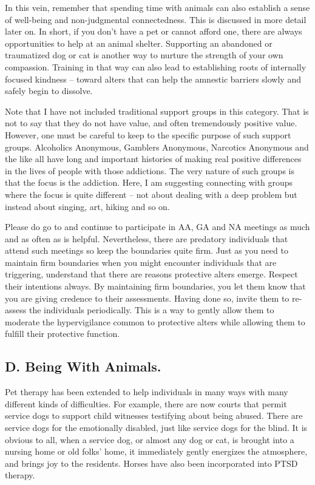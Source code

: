\documentclass[]{book}
\begin{document}
In this vein, remember that spending time with animals can also establish a sense of well-being and non-judgmental connectedness. This is discussed in more detail later on. In short, if you don't have a pet or cannot afford one, there are always opportunities to help at an animal shelter. Supporting an abandoned or traumatized dog or cat is another way to nurture the strength of your own compassion. Training in that way can also lead to establishing roots of internally focused kindness -- toward alters that can help the amnestic barriers slowly and safely begin to dissolve.

Note that I have not included traditional support groups in this category. That is not to say that they do not have value, and often tremendously positive value. However, one must be careful to keep to the specific purpose of such support groups. Alcoholics Anonymous, Gamblers Anonymous, Narcotics Anonymous and the like all have long and important histories of making real positive differences in the lives of people with those addictions. The very nature of such groups is that the focus is the addiction. Here, I am suggesting connecting with groups where the focus is quite different -- not about dealing with a deep problem but instead about singing, art, hiking and so on.

Please do go to and continue to participate in AA, GA and NA meetings as much and as often as is helpful. Nevertheless, there are predatory individuals that attend such meetings so keep the boundaries quite firm.
Just as you need to maintain firm boundaries when you might encounter individuals that are triggering, understand that there are reasons protective alters emerge. Respect their intentions always. By maintaining firm boundaries, you let them know that you are giving credence to their assessments. Having done so, invite them to re-assess the individuals periodically. This is a way to gently allow them to moderate the hypervigilance common to protective alters while allowing them to fulfill their protective function.

\hypertarget{d.-being-with-animals.}{%
\subsection*{D. Being With Animals.}\label{d.-being-with-animals.}}

Pet therapy has been extended to help individuals in many ways with many different kinds of difficulties. For example, there are now courts that permit service dogs to support child witnesses testifying about being abused. There are service dogs for the emotionally disabled, just like service dogs for the blind. It is obvious to all, when a service dog, or almost any dog or cat, is brought into a nursing home or old folks' home, it immediately gently energizes the atmosphere, and brings joy to the residents. Horses have also been incorporated into PTSD therapy.
\end{document}
